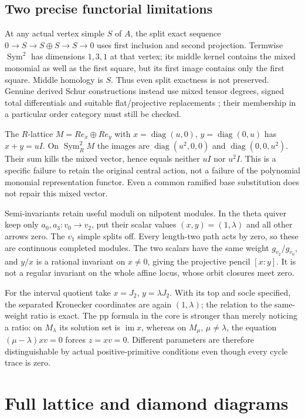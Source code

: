 \documentclass[11pt]{article}
\theoremstyle{definition}\newtheorem{definition}[theorem]{Definition}
\theoremstyle{remark}\newtheorem{remark}[theorem]{Remark}
\begin{document}
\subsection{Two precise functorial limitations}
At any actual vertex simple $S$ of $A$, the split exact sequence $0\to S\to S\oplus S\to S\to0$ uses first inclusion and second projection. Termwise $\operatorname{Sym}^2$ has dimensions $1,3,1$ at that vertex; its middle kernel contains the mixed monomial as well as the first square, but its first image contains only the first square. Middle homology is $S$. Thus even split exactness is not preserved. Genuine derived Schur constructions instead use mixed tensor degrees, signed total differentials and suitable flat/projective replacements \cite{SchurComplexes,DerivedSchur}; their membership in a particular order category must still be checked.

The $R$-lattice $M=R e_x\oplus R e_y$ with $x=\operatorname{diag}(u,0)$, $y=\operatorname{diag}(0,u)$ has $x+y=uI$. On $\operatorname{Sym}^2_RM$ the images are $\operatorname{diag}(u^2,0,0)$ and $\operatorname{diag}(0,0,u^2)$. Their sum kills the mixed vector, hence equals neither $uI$ nor $u^2I$. This is a specific failure to retain the original central action, not a failure of the polynomial monomial representation functor. Even a common ramified base substitution does not repair this mixed vector.

Semi-invariants retain useful moduli on nilpotent modules. In the theta quiver keep only $a_0,a_3:v_0\to v_2$, put their scalar values $(x,y)=(1,\lambda)$ and all other arrows zero. The $v_1$ simple splits off. Every length-two path acts by zero, so these are continuous completed modules. The two scalars have the same weight $g_{v_2}/g_{v_0}$, and $y/x$ is a rational invariant on $x\ne0$, giving the projective pencil $[x:y]$. It is not a regular invariant on the whole affine locus, whose orbit closures meet zero.

For the interval quotient take $x=J_2$, $y=\lambda J_2$. With its top and socle specified, the separated Kronecker coordinates are again $(1,\lambda)$; the relation to the same-weight ratio is exact. The pp formula in the core is stronger than merely noticing a ratio: on $M_\lambda$ its solution set is $\operatorname{im}x$, whereas on $M_\mu$, $\mu\ne\lambda$, the equation $(\mu-\lambda)xv=0$ forces $z=xv=0$. Different parameters are therefore distinguishable by actual positive-primitive conditions even though every cycle trace is zero.

\section{Full lattice and diamond diagrams}
\end{document}
